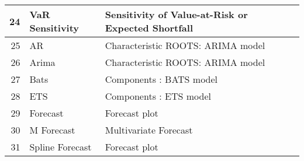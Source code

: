 \begin{table}
\begin{tabular}{r|p{4cm}|ll}
		24 & VaR Sensitivity &	Sensitivity of Value-at-Risk or Expected Shortfall   & \\
		\hline
		25 & AR	 & Characteristic ROOTS: ARIMA model  & \\
		26 & Arima & Characteristic ROOTS: ARIMA model  & \\
		27 & Bats & Components : BATS model  & \\
		28 & ETS & Components : ETS model  & \\
		29 & Forecast & Forecast plot  & \\
		30 & M Forecast & Multivariate Forecast  & \\
		31 & Spline Forecast & 	Forecast plot  & \\
		\hline
	\end{tabular}
\end{table}


